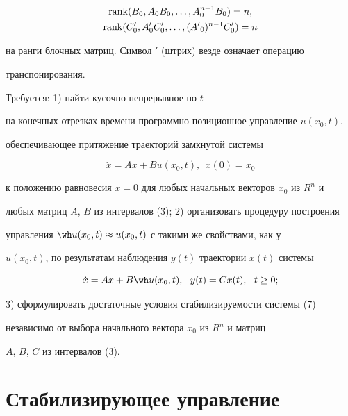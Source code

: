 \begin{gather}


\rank (B_0, A_0B_0, \dotsc, A^{n-1}_0B_0) = n,\\


\rank (C_0', A_0'C_0', \dotsc, ({A'}_0)^{n-1} C_0') = n


\end{gather} 


на ранги блочных матриц. Символ $'$ (штрих) везде означает операцию


транспонирования.





Требуется: 1) найти кусочно-непрерывное по $t$


на конечных отрезках времени программно-позиционное управление $u(x_0, t)$,


обеспечивающее притяжение траекторий замкнутой системы


\begin{equation}


\Dot x = Ax+Bu(x_0,t), \ \ x(0)=x_0


\end{equation}%


к положению равновесия $x=0$ для любых начальных векторов $x_0$ из $R^n$ и


любых матриц $A$, $B$ из интервалов (3); 2) организовать процедуру построения


управления $\wh u(x_0, t) \approx u(x_0, t)$ с такими же свойствами, как у


$ u(x_0, t)$, по результатам наблюдения $ y(t)$ траектории $ x(t) $ системы


\begin{equation}


\Dot x = Ax+B \wh u(x_0,t), \ \ y(t)=Cx(t), \ \ t \ge 0;


\end{equation}


3) сформулировать достаточные условия стабилизируемости системы (7)


независимо от выбора начального вектора $x_0$ из $R^n$ и матриц


$A$, $B$, $C$ из интервалов (3).





\section{Стабилизирующее управление}






